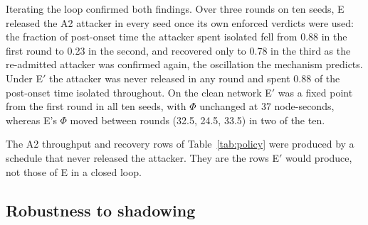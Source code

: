 Iterating the loop confirmed both findings. Over three rounds on ten seeds,
E released the A2 attacker in every seed once its own enforced verdicts were
used: the fraction of post-onset time the attacker spent isolated fell from
0.88 in the first round to 0.23 in the second, and recovered only to 0.78 in
the third as the re-admitted attacker was confirmed again, the oscillation the
mechanism predicts. Under E$'$ the attacker was never released in any round
and spent 0.88 of the post-onset time isolated throughout. On the clean
network E$'$ was a fixed point from the first round in all ten seeds, with
$\Phi$ unchanged at 37 node-seconds, whereas E's $\Phi$ moved between rounds
(32.5, 24.5, 33.5) in two of the ten.

The A2 throughput and recovery rows of Table~\ref{tab:policy} were produced
by a schedule that never released the attacker. They are the rows E$'$ would
produce, not those of E in a closed loop.

\subsection{Robustness to shadowing}
\label{sec:shadow}

